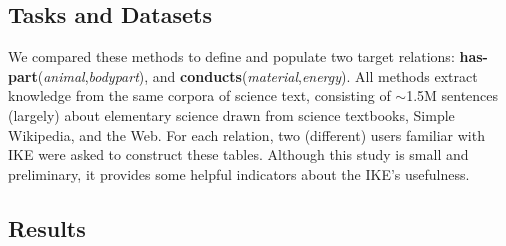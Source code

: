 \documentclass[11pt,letterpaper]{article}
\newcommand{\pred}{\bf}
\begin{document}
\subsection{Tasks and Datasets}

We compared these methods to define and populate two target relations: {\pred has-part}({\it animal},{\it bodypart}), and {\pred conducts}({\it material},{\it energy}).
All methods extract knowledge from the same corpora of science text, consisting of $\sim$1.5M sentences (largely) about elementary science drawn from science textbooks, Simple Wikipedia, and the Web. For each relation, two (different) users familiar with IKE were asked to construct these tables. Although this study is small and preliminary, it provides some helpful indicators about the IKE's usefulness.


\subsection{Results}

\begin{table}[tbh]
\centering
\boldmath
{}
\caption{{\pred conducts}({\it material},{\it energy}) table: IKE helps the user discover substantially more patterns than the manual method (41 vs. 5), with similar precision and in less time, resulting in the overall highest yield. Fully automatic bootstrapping produced a large number of low precision patterns and overall lower yield than IKE.} 
\label{table:conducts}
\end{table}
\end{document}
